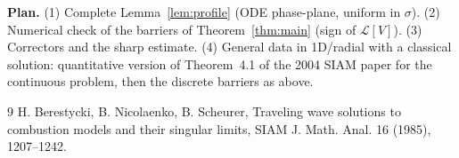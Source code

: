 \documentclass[11pt]{amsart}
\theoremstyle{remark}
\newcommand{\Lop}{\mathcal{L}}
\begin{document}
\medskip
\noindent\textbf{Plan.}
(1) Complete Lemma~\ref{lem:profile} (ODE phase-plane, uniform in $\sigma$).
(2) Numerical check of the barriers of Theorem~\ref{thm:main} (sign of $\Lop[V]$).
(3) Correctors and the sharp estimate.
(4) General data in 1D/radial with a classical solution: quantitative
version of Theorem~4.1 of the 2004 SIAM paper for the continuous problem, then the
discrete barriers as above.

\begin{thebibliography}{9}
 H. Berestycki, B. Nicolaenko, B. Scheurer, Traveling wave solutions to
combustion models and their singular limits, SIAM J. Math. Anal. 16 (1985), 1207--1242.
\end{thebibliography}
\end{document}
